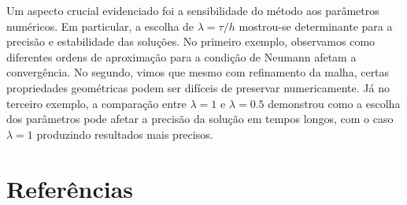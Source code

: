 \documentclass[column,amsmath,amssymb,floatfix]{revtex4}
\begin{document}
Um aspecto crucial evidenciado foi a sensibilidade do método aos parâmetros numéricos. Em particular, a escolha de $\lambda = \tau/h$ mostrou-se determinante para a precisão e estabilidade das soluções. No primeiro exemplo, observamos como diferentes ordens de aproximação para a condição de Neumann afetam a convergência. No segundo, vimos que mesmo com refinamento da malha, certas propriedades geométricas podem ser difíceis de preservar numericamente. Já no terceiro exemplo, a comparação entre $\lambda = 1$ e $\lambda = 0.5$ demonstrou como a escolha dos parâmetros pode afetar a precisão da solução em tempos longos, com o caso $\lambda = 1$ produzindo resultados mais precisos.

\section{Referências}
\nocite{*}
\printbibliography[heading=none]
\end{document}

